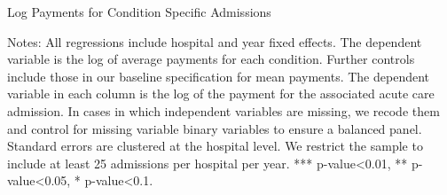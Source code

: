 \documentclass[12pt]{article}
\begin{document}
\newpage
{}
\setlength{\captionmargin}{.5 \textwidth} \addtolength{\captionmargin}{-.5\wd\gfxbox}
\begin{table}[!h]
\centering
\caption{Log Payments for Condition Specific Admissions}
\label{tab:eachcondition}
\usebox{\gfxbox}
\par
\begin{minipage}{\wd\gfxbox}
\footnotesize
Notes: All regressions include hospital and year fixed effects.  The dependent variable is the log of average payments for each condition.  Further controls include those in our baseline specification for mean payments.  The dependent variable in each column is the log of the payment for the associated acute care admission.  In cases in which independent variables are missing, we recode them and control for missing variable binary variables to ensure a balanced panel.  Standard errors are clustered at the hospital level.  We restrict the sample to include at least 25 admissions per hospital per year.  *** p-value<0.01, ** p-value<0.05, * p-value<0.1.
\end{minipage}
\end{table}
\end{document}
